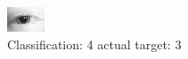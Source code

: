 \begin{figure}[h!]
\begin{center}
\includegraphics[width=0.60\columnwidth]{figures/ID86_class_4_target_3.png}
\end{center}
\caption{ Classification: 4 actual target: 3}
\label{fig:ID86_class_4_target_3}
\end{figure}
